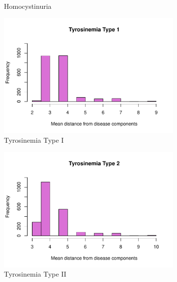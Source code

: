 \begin{figure}[h!]
\begin{subfigure}[b]{0.3\textwidth}
         \caption{Homocystinuria}
         \label{fig:Homocystinuria}
     \end{subfigure}
     \hfill
     \begin{subfigure}[b]{0.3\textwidth}
         \centering
         \includegraphics[scale=0.25]{Images/Tyrosinemia Type I.pdf}
         \caption{Tyrosinemia Type I}
         \label{fig:Tyrosinemia Type I}
     \end{subfigure}
     \hfill
     \begin{subfigure}[b]{0.3\textwidth}
         \centering
         \includegraphics[scale=0.25]{Images/Tyrosinemia Type II.pdf}
         \caption{Tyrosinemia Type II}
         \label{fig:Tyrosinemia Type II}
     \end{subfigure}
     \hfill
     \begin{subfigure}[b]{0.3\textwidth}
         \centering

\end{subfigure}
\end{figure}
